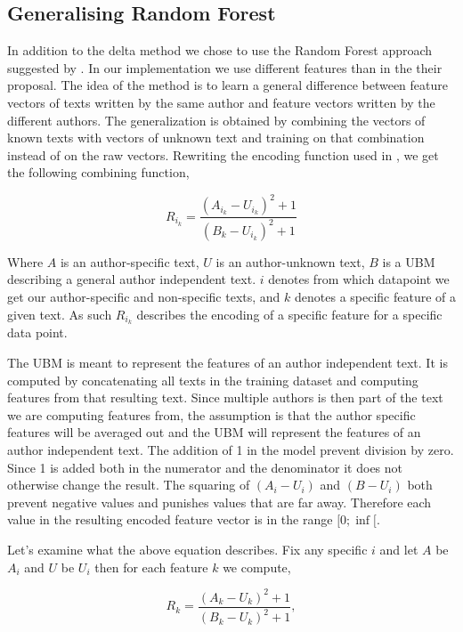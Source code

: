 \subsection{Generalising Random Forest} \label{subsec:Generalising Random Forest}
In addition to the delta method we chose to use the Random Forest approach
suggested by \cite{pacheco2015}. In our implementation we use different features
than in the their proposal. The idea of the method is to learn a general
difference between feature vectors of texts written by the same author and
feature vectors written by the different authors. The generalization is obtained
by combining the vectors of known texts with vectors of unknown text and
training on that combination instead of on the raw vectors. Rewriting the
encoding function used in \cite{pacheco2015}, we get the following combining
function,

\begin{equation}
        R_{i_k} = \frac{(A_{i_k}-U_{i_k})^2+1}{(B_k-U_{i_k})^2+1}
\end{equation}

Where $A$ is an author-specific text, $U$ is an author-unknown text, $B$ is a
\gls{UBM} describing a general author independent text. $i$ denotes from which
datapoint we get our author-specific and non-specific texts, and $k$ denotes a
specific feature of a given text. As such $R_{i_k}$ describes the encoding of a
specific feature for a specific data point.

The \gls{UBM} is meant to represent the features of an author independent text.
It is computed by concatenating all texts in the training dataset and computing
features from that resulting text. Since multiple authors is then part of the
text we are computing features from, the assumption is that the author specific
features will be averaged out and the \gls{UBM} will represent the features of
an author independent text. The addition of 1 in the model prevent division
by zero. Since 1 is added both in the numerator and the denominator it does
not otherwise change the result. The squaring of $(A_i - U_i)$ and $(B - U_i)$
both prevent negative values and punishes values that are far away. Therefore
each value in the resulting encoded feature vector is in the range $[0; \inf[$.

Let's examine what the above equation describes. Fix any specific $i$ and let
$A$ be $A_i$ and $U$ be $U_i$ then for each feature $k$ we compute,

\begin{equation}
\label{eq:rf-encode}
    R_k = \frac{(A_k-U_k)^2+1}{(B_k-U_k)^2+1},
\end{equation}

